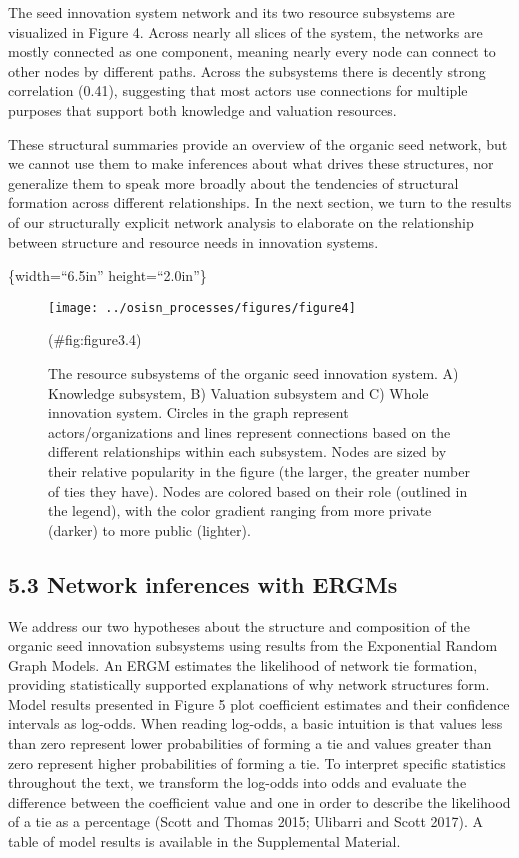 \documentclass[twoside,12pt,final]{ucthesis-CA2012}
\begin{document}
\begin{ucmainmatter}
The seed innovation system network and its two resource subsystems are
visualized in Figure 4. Across nearly all \textquotesingle slices\textquotesingle{} of the system, the
networks are mostly connected as one component, meaning nearly every
node can connect to other nodes by different \textquotesingle paths\textquotesingle. Across the
subsystems there is decently strong correlation (0.41), suggesting that
most actors use connections for multiple purposes that support both
knowledge and valuation resources.

These structural summaries provide an overview of the organic seed
network, but we cannot use them to make inferences about what drives
these structures, nor generalize them to speak more broadly about the
tendencies of structural formation across different relationships. In
the next section, we turn to the results of our structurally explicit
network analysis to elaborate on the relationship between structure and
resource needs in innovation systems.

\{width=``6.5in'' height=``2.0in''\}
\begin{figure}

{\centering \texttt{[image: ../osisn\_processes/figures/figure4]} 

}

\caption{The resource subsystems of the organic seed innovation system. A) Knowledge subsystem, B) Valuation subsystem and C) Whole innovation system. Circles in the graph represent actors/organizations and lines represent connections based on the different relationships within each subsystem. Nodes are sized by their relative popularity in the figure (the larger, the greater number of ties they have). Nodes are colored based on their role (outlined in the legend), with the color gradient ranging from more private (darker) to more public (lighter).  }(\#fig:figure3.4)
\end{figure}
\hypertarget{network-inferences-with-ergms}{%
\subsection{5.3 Network inferences with ERGMs}\label{network-inferences-with-ergms}}

We address our two hypotheses about the structure and composition of the
organic seed innovation subsystems using results from the Exponential
Random Graph Models. An ERGM estimates the likelihood of network tie
formation, providing statistically supported explanations of why network
structures form. Model results presented in Figure 5 plot coefficient
estimates and their confidence intervals as log-odds. When reading
log-odds, a basic intuition is that values less than zero represent
lower probabilities of forming a tie and values greater than zero
represent higher probabilities of forming a tie. To interpret specific
statistics throughout the text, we transform the log-odds into odds and
evaluate the difference between the coefficient value and one in order
to describe the likelihood of a tie as a percentage (Scott and Thomas
2015; Ulibarri and Scott 2017). A table of model results is available in
the Supplemental Material.


\end{ucmainmatter}
\end{document}
